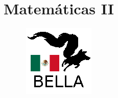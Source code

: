 \documentclass{book}
\begin{document}
\title{Matemáticas II}
\author{\includegraphics{../../logos/128x128-mexico.png}}

\maketitle

\tableofcontents













\end{document}
